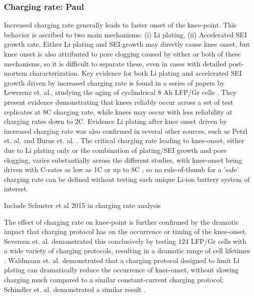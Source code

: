 \documentclass{article}
\begin{document}
\subsubsection{Charging rate: Paul}
Increased charging rate generally leads to faster onset of the knee-point. This behavior is ascribed to two main mechanisms: (i) Li plating, (ii) Accelerated SEI growth rate. Either Li plating and SEI growth may directly cause knee onset, but knee onset is also attributed to pore clogging caused by either or both of these mechanisms, so it is difficult to separate these, even in cases with detailed post-mortem characterization. Key evidence for both Li plating and accelerated SEI growth driven by increased charging rate is found in a series of papers by Lewerenz et. al., studying the aging of cyclindrical 8 Ah LFP/Gr cells \cite{lewerenz_systematic_2017,lewerenz_post-mortem_2017}. They present evidence demonstrating that knees reliably occur across a set of test replicates at 8C charging rate, while knees may occur with less reliability at charging rates down to 2C.  Evidence Li plating after knee onset driven by increased charging rate was also confirmed in several other sources, such as Petzl et. al. \cite{petzl_lithium_2015} and Burns et. al. \cite{burns_-situ_2015}. The critical charging rate leading to knee-onset, either due to Li plating only or the combination of plating/SEI growth and pore clogging, varies substantially across the different studies, with knee-onset being driven with C-rates as low as 1C \cite{waldmann_optimization_2015} or up to 8C \cite{lewerenz_systematic_2017}, so no rule-of-thumb for a 'safe' charging rate can be defined without testing each unique Li-ion battery system of interest.

Include Schuster et al 2015 in charging rate analysis

The effect of charging rate on knee-point is further confirmed by the dramatic impact that charging protocol has on the occurrence or timing of the knee-onset. Severson et. al. demonstrated this conclusively by testing 124 LFP/Gr cells with a wide variety of charging protocols, resulting in a dramatic range of cell lifetimes \cite{severson_data-driven_2019}. Waldmann et. al. \cite{waldmann_optimization_2015} demonstrated that a  charging protocol designed to limit Li plating can dramatically reduce the occurrence of knee-onset, without slowing charging much compared to a similar constant-current charging protocol; Schindler et. al. demonstrated a similar result \cite{schindler_fast_2018}. 
\end{document}
